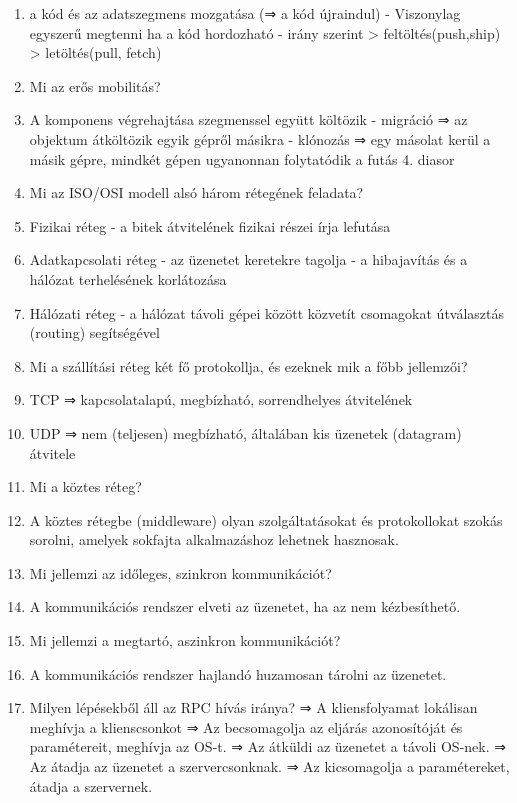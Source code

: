 \documentclass[twoside, a4paper, 12pt]{article}
\begin{document}
\begin{enumerate}
    \item a kód és az adatszegmens mozgatása (⇒ a kód újraindul)
        - Viszonylag egyszerű megtenni ha a kód hordozható
        - irány szerint
        > feltöltés(push,ship)
        > letöltés(pull, fetch)
    \item  Mi az erős mobilitás?
    \item A komponens végrehajtása szegmenssel együtt költözik
        - migráció ⇒ az objektum átköltözik egyik gépről másikra
        - klónozás ⇒ egy másolat kerül a másik gépre, mindkét gépen ugyanonnan folytatódik a futás
        4. diasor
    \item  Mi az ISO/OSI modell alsó három rétegének feladata?
    \item Fizikai réteg
        - a bitek átvitelének fizikai részei írja lefutása
    \item Adatkapcsolati réteg
        - az üzenetet keretekre tagolja
        - a hibajavítás és a hálózat terhelésének korlátozása
    \item Hálózati réteg
        - a hálózat távoli gépei között közvetít csomagokat útválasztás (routing) segítségével
    \item  Mi a szállítási réteg két fő protokollja, és ezeknek mik a főbb jellemzői?
    \item TCP ⇒ kapcsolatalapú, megbízható, sorrendhelyes átvitelének
    \item UDP ⇒ nem (teljesen) megbízható, általában kis üzenetek (datagram) átvitele	
    \item  Mi a köztes réteg?
    \item A köztes rétegbe (middleware) olyan szolgáltatásokat és protokollokat szokás sorolni, amelyek sokfajta alkalmazáshoz lehetnek hasznosak.
    \item  Mi jellemzi az időleges, szinkron kommunikációt?
    \item A kommunikációs rendszer elveti az üzenetet, ha az nem kézbesíthető.
    \item  Mi jellemzi a megtartó, aszinkron kommunikációt?
    \item A kommunikációs rendszer hajlandó huzamosan tárolni az üzenetet.
    \item  Milyen lépésekből áll az RPC hívás iránya?
        ⇒ A kliensfolyamat lokálisan meghívja a klienscsonkot
        ⇒ Az becsomagolja az eljárás azonosítóját és paramétereit, meghívja az OS-t.
        ⇒ Az átküldi az üzenetet a távoli OS-nek.
        ⇒ Az átadja az üzenetet a szervercsonknak.
        ⇒ Az kicsomagolja a paramétereket, átadja a szervernek.

\end{enumerate}
\end{document}
